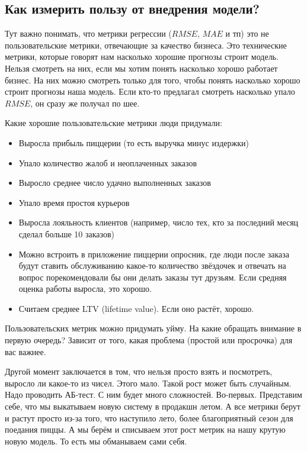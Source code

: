 \documentclass[12pt, a4paper, oneside]{article}
\begin{document}
\subsection*{Как измерить пользу от внедрения модели?}

Тут важно понимать, что метрики регрессии ($RMSE$, $MAE$ и тп) это не пользовательские метрики, отвечающие за качество бизнеса. Это технические метрики, которые говорят нам насколько хорошие прогнозы строит модель. Нельзя смотреть на них, если мы хотим понять насколько хорошо работает бизнес. На них можно смотреть только для того, чтобы понять насколько хорошо строит прогнозы наша модель.  Если кто-то предлагал смотреть насколько упало $RMSE$, он сразу же получал по шее. 

Какие хорошие пользовательские метрики люди придумали: 

\begin{itemize}
	\item Выросла прибыль пиццерии (то есть выручка минус издержки)
	\item Упало количество жалоб и неоплаченных заказов 
	\item Выросло среднее число удачно выполненных заказов 
	\item Упало время простоя курьеров 
	\item Выросла лояльность клиентов (например, число тех, кто за последний месяц сделал больше 10 заказов)
	\item Можно встроить в приложение пиццерии опросник, где люди после заказа будут ставить обслуживанию какое-то количество звёздочек и отвечать на вопрос порекомендовали бы они делать заказы тут друзьям. Если средняя оценка работы выросла, это хорошо.
	\item Считаем среднее LTV (lifetime value). Если оно растёт, хорошо. 
\end{itemize}

Пользовательских метрик можно придумать уйму. На какие обращать внимание в первую очередь? Зависит от того, какая проблема (простой или просрочка) для вас важнее. 

Другой момент заключается в том, что нельзя просто взять и посмотреть, выросло ли какое-то из чисел. Этого мало. Такой рост может быть случайным. Надо проводить АБ-тест. С ним будет много сложностей. Во-первых. Представим себе, что мы выкатываем новую систему в продакшн летом. А все метрики берут и растут просто из-за того, что наступило лето, более благоприятный сезон для поедания пиццы. А мы берём и списываем этот рост метрик на нашу крутую новую модель. То есть мы обманываем сами себя. 
\end{document}

